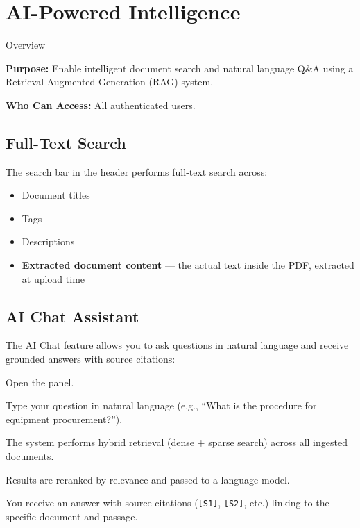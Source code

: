 \section{AI-Powered Intelligence}

\begin{ugModule}{Overview}

  \textbf{Purpose:}
  Enable intelligent document search and natural language Q\&A
  using a Retrieval-Augmented Generation (RAG) system.

  \textbf{Who Can Access:}
  All authenticated users.
\end{ugModule}

\subsection{Full-Text Search}

The search bar in the header performs full-text search across:

\begin{itemize}[leftmargin=18pt]
  \item Document titles
  \item Tags
  \item Descriptions
  \item \textbf{Extracted document content} --- the actual text
    inside the PDF, extracted at upload time
\end{itemize}

\subsection{AI Chat Assistant}

The AI Chat feature allows you to ask questions in natural
language and receive grounded answers with source citations:

\begin{ugSteps}
  \item Open the  panel.
  \item Type your question in natural language
        (e.g., ``What is the procedure for equipment
        procurement?'').
  \item The system performs hybrid retrieval (dense + sparse
        search) across all ingested documents.
  \item Results are reranked by relevance and passed to a
        language model.
  \item You receive an answer with source citations
        (\texttt{[S1]}, \texttt{[S2]}, etc.) linking to the
        specific document and passage.
\end{ugSteps}

